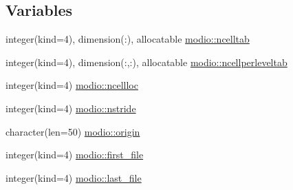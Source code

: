 \subsection*{Variables}
\begin{DoxyCompactItemize}
\item 
integer(kind=4), dimension(\+:), allocatable \hyperlink{namespacemodio_a0a0852674d63f2d9f6c23969d3f7016c}{modio\+::ncelltab}
\item 
integer(kind=4), dimension(\+:,\+:), allocatable \hyperlink{namespacemodio_a541838a88faeed3af974f875bd73ee00}{modio\+::ncellperleveltab}
\item 
integer(kind=4) \hyperlink{namespacemodio_a1c862995bd67ce8f4a3305dad6022064}{modio\+::ncellloc}
\item 
integer(kind=4) \hyperlink{namespacemodio_a6661d8a6f911c13b15cebca52e76b6fc}{modio\+::nstride}
\item 
character(len=50) \hyperlink{namespacemodio_a12ada16137589f81ccc218e3b77f25c6}{modio\+::origin}
\item 
integer(kind=4) \hyperlink{namespacemodio_a2eee1b20e9f6d0c4ab4e219d76aefc9a}{modio\+::first\+\_\+file}
\item 
integer(kind=4) \hyperlink{namespacemodio_a3e203a61ede6084d5dd96d438500b155}{modio\+::last\+\_\+file}
\end{DoxyCompactItemize}
